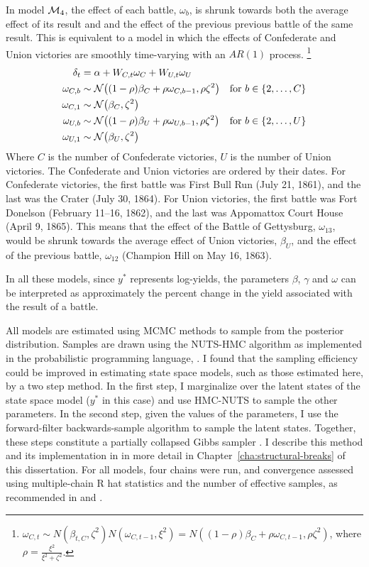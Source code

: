 In model $\mathcal{M}_{\text{4}}$, the effect of each battle, $\omega_{b}$, is shrunk towards both the average effect of its result and and the effect of the previous previous battle of the same result.
This is equivalent to a model in which the effects of Confederate and Union victories are smoothly time-varying with an $AR(1)$ process.%
\footnote{
   $\omega_{C,t} \sim N(\beta_{t,C}, \zeta^{2}) N(\omega_{C,t-1}, \xi^{2}) = N((1 - \rho) \beta_{C} + \rho \omega_{C,t-1}, \rho \zeta^{2})$, where $\rho = \frac{\xi^{2}}{\xi^{2} + \zeta^{2}}$.
}
\begin{align}
  \label{bonds:eq:11}
  \delta_{t} &= \alpha + W_{C,t} \omega_{C} + W_{U,t} \omega_{U} \\
  \omega_{C,b} & \sim \mathcal{N}\mathopen{}\left((1 - \rho) \beta_{C} + \rho \omega_{C,b-1}, \rho \zeta^{2}\right)\mathclose{} & \text{for $b \in \{2, \dots, C\}$} \\
  \omega_{C,1} & \sim \mathcal{N}\mathopen{}\left( \beta_{C}, \zeta^{2}\right)\mathclose{} \\
  \omega_{U,b} & \sim \mathcal{N}\mathopen{}\left((1 - \rho) \beta_{U} + \rho \omega_{U,b-1}, \rho \zeta^{2}\right)\mathclose{} & \text{for $b \in \{2, \dots, U \}$} \\
  \omega_{U,1} & \sim \mathcal{N}\mathopen{}\left( \beta_{U}, \zeta^{2}\right)\mathclose{}
\end{align}
Where $C$ is the number of Confederate victories, $U$ is the number of Union victories.
The Confederate and Union victories are ordered by their dates.
For Confederate victories, the first battle was First Bull Run (July 21, 1861), and the last was the Crater (July 30, 1864).
For Union victories, the first battle was Fort Donelson (February 11--16, 1862), and the last was Appomattox Court House (April 9, 1865).
This means that the effect of the Battle of Gettysburg, $\omega_{13}$, would be shrunk towards the average effect of Union victories, $\beta_{U}$, and the effect of the previous battle, $\omega_{12}$ (Champion Hill on May 16, 1863).%

In all these models, since $y^{*}$ represents log-yields, the parameters $\beta$, $\gamma$ and $\omega$ can be interpreted as approximately the percent change in the yield associated with the result of a battle.

All models are estimated using MCMC methods to sample from the posterior distribution.
Samples are drawn using the NUTS-HMC algorithm \parencite{HoffmanGelman2014a} as implemented in the probabilistic programming language, \Stan{} \parencites{Stan2015a}.
I found that the sampling efficiency could be improved in estimating state space models, such as those estimated here, by a two step method.
In the first step, I marginalize over the latent states of the state space model ($y^{*}$ in this case) and use HMC-NUTS to sample the other parameters.
In the second step, given the values of the parameters, I use the forward-filter backwards-sample algorithm  to sample the latent states.
Together, these steps constitute a partially collapsed Gibbs sampler \parencite{VanDykPark2008a}.
I describe this method and its implementation in \Stan{} in more detail in Chapter~\ref{cha:structural-breaks} of this dissertation.
For all models, four chains were run, and convergence assessed using multiple-chain R hat statistics and the number of effective samples, as recommended in \parencites{Stan2015a} and \textcite{GelmanCarlinSternEtAl2013a}.

